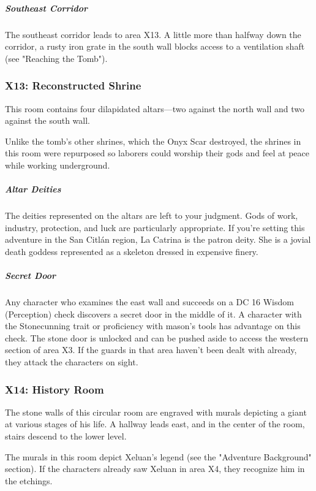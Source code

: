 \documentclass[10pt,a4paper,twoside,bg=print,twocolumn,openany,nodeprecatedcode]{dndbook}
\begin{document}
\subparagraph{Southeast Corridor}
The southeast corridor leads to area X13. A little more than halfway down the corridor, a rusty iron grate in the south wall blocks access to a ventilation shaft (see "Reaching the Tomb").

\subsubsection{X13: Reconstructed Shrine}
\begin{DndReadAloud}{}
This room contains four dilapidated altars—two against the north wall and two against the south wall.

\end{DndReadAloud}

Unlike the tomb's other shrines, which the Onyx Scar destroyed, the shrines in this room were repurposed so laborers could worship their gods and feel at peace while working underground.

\subparagraph{Altar Deities}
The deities represented on the altars are left to your judgment. Gods of work, industry, protection, and luck are particularly appropriate. If you're setting this adventure in the San Citlán region, La Catrina is the patron deity. She is a jovial death goddess represented as a skeleton dressed in expensive finery.

\subparagraph{Secret Door}
Any character who examines the east wall and succeeds on a DC 16 Wisdom (Perception) check discovers a secret door in the middle of it. A character with the Stonecunning trait or proficiency with mason's tools has advantage on this check. The stone door is unlocked and can be pushed aside to access the western section of area X3. If the guards in that area haven't been dealt with already, they attack the characters on sight.

\subsubsection{X14: History Room}
\begin{DndReadAloud}{}
The stone walls of this circular room are engraved with murals depicting a giant at various stages of his life. A hallway leads east, and in the center of the room, stairs descend to the lower level.

\end{DndReadAloud}

The murals in this room depict Xeluan's legend (see the "Adventure Background" section). If the characters already saw Xeluan in area X4, they recognize him in the etchings.
\end{document}
